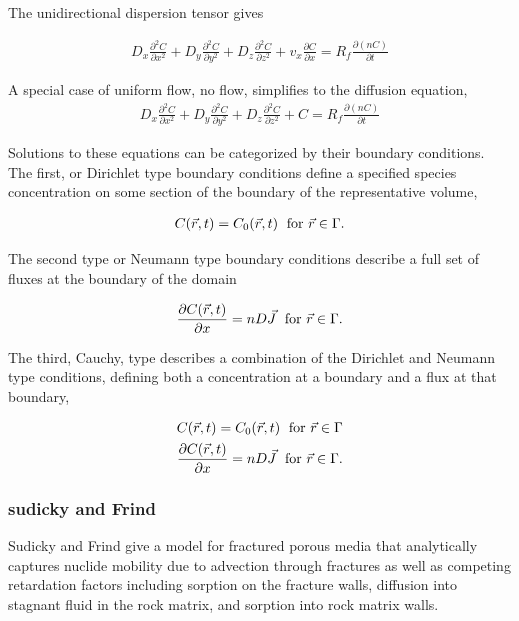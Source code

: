 The unidirectional dispersion tensor gives 

\begin{align}
  D_x \frac{\partial^2 C}{\partial x^2} +
  D_y \frac{\partial^2 C}{\partial y^2} +
  D_z \frac{\partial^2 C}{\partial z^2} +
  v_x \frac{\partial C}{\partial x}  = R_f 
  \frac{\partial(nC)}{\partial t} 
  \label{unidirflow}
\end{align}

A special case of uniform flow, no flow, simplifies to the diffusion equation,
\begin{align}
  D_x \frac{\partial^2 C}{\partial x^2} +
  D_y \frac{\partial^2 C}{\partial y^2} +
  D_z \frac{\partial^2 C}{\partial z^2} +
  C = R_f 
  \frac{\partial(nC)}{\partial t} 
  \label{diffusion}
\end{align}

Solutions to these equations can be categorized by their boundary conditions. 
The first, or Dirichlet type boundary conditions define a specified species 
concentration on some section of the boundary of the representative volume, 

\begin{align*}
  C(\vec{r},t) = C_0(\vec{r},t)\hspace{1mm}\mbox{ for } \vec{r} \in \Gamma.
\end{align*}

The second type or Neumann type boundary conditions describe a full set of 
fluxes at  the boundary of the domain

\begin{align*}
  \frac{\partial C(\vec{r},t)}{\partial x} = nD\vec{J} \hspace{1mm}\mbox{ for } \vec{r} \in \Gamma.
\end{align*}

The third, Cauchy, type describes a combination of the Dirichlet and Neumann 
type conditions, defining both a concentration at a boundary and a flux at that 
boundary, 

\begin{align*}
  C(\vec{r},t) = C_0(\vec{r},t)\hspace{1mm}\mbox{ for } \vec{r} \in \Gamma\\
  \frac{\partial C(\vec{r},t)}{\partial x} = nD\vec{J} \hspace{1mm}\mbox{ for } \vec{r} \in \Gamma.
\end{align*}


\subsubsection{sudicky and Frind}
Sudicky and Frind give a model for fractured porous media that 
analytically captures nuclide mobility due to advection through 
fractures as well as competing retardation factors including sorption on the 
fracture walls, diffusion into stagnant fluid in the rock matrix, and 
sorption into rock matrix walls. 


